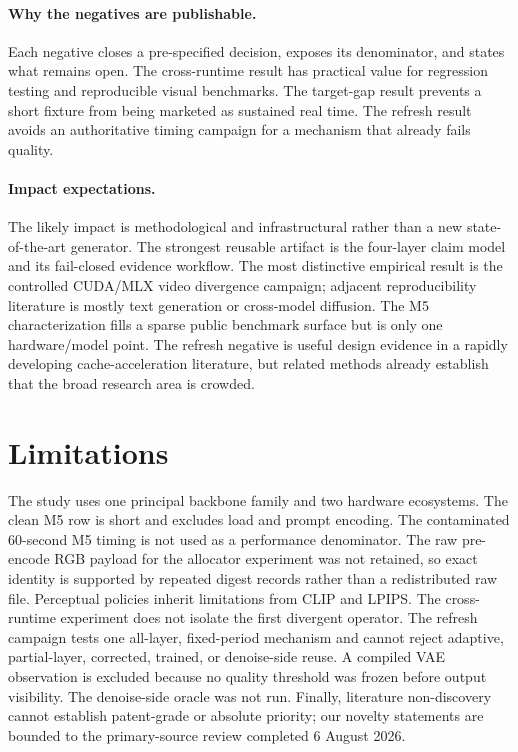 \documentclass[10pt,twocolumn]{article}
\begin{document}
\paragraph{Why the negatives are publishable.}
Each negative closes a pre-specified decision, exposes its denominator, and states what remains open. The cross-runtime result has practical value for regression testing and reproducible visual benchmarks. The target-gap result prevents a short fixture from being marketed as sustained real time. The refresh result avoids an authoritative timing campaign for a mechanism that already fails quality.

\paragraph{Impact expectations.}
The likely impact is methodological and infrastructural rather than a new state-of-the-art generator. The strongest reusable artifact is the four-layer claim model and its fail-closed evidence workflow. The most distinctive empirical result is the controlled CUDA/MLX video divergence campaign; adjacent reproducibility literature is mostly text generation or cross-model diffusion. The M5 characterization fills a sparse public benchmark surface but is only one hardware/model point. The refresh negative is useful design evidence in a rapidly developing cache-acceleration literature, but related methods already establish that the broad research area is crowded.

\section{Limitations}
The study uses one principal backbone family and two hardware ecosystems. The clean M5 row is short and excludes load and prompt encoding. The contaminated 60-second M5 timing is not used as a performance denominator. The raw pre-encode RGB payload for the allocator experiment was not retained, so exact identity is supported by repeated digest records rather than a redistributed raw file. Perceptual policies inherit limitations from CLIP and LPIPS. The cross-runtime experiment does not isolate the first divergent operator. The refresh campaign tests one all-layer, fixed-period mechanism and cannot reject adaptive, partial-layer, corrected, trained, or denoise-side reuse. A compiled VAE observation is excluded because no quality threshold was frozen before output visibility. The denoise-side oracle was not run. Finally, literature non-discovery cannot establish patent-grade or absolute priority; our novelty statements are bounded to the primary-source review completed 6 August 2026.
\end{document}
